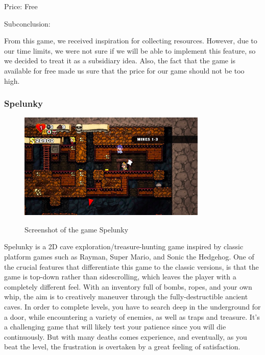 \documentclass[12p]{article}
\begin{document}
Price: Free

Subconclusion:

From this game, we received inspiration for collecting resources. However, due to our time limits, we were not sure if we will be able to implement this feature, so we decided to treat it as a subsidiary idea. Also, the fact that the game is available for free made us sure that the price for our game should not be too high.



\newpage
\subsubsection[Spelunky]{Spelunky \cite{Spelunky}}

\begin{figure}[ht]
 \center
 \includegraphics[width=0.8\textwidth]{StateOfTheArtScreenshots/spelunky}
 \label{sec:StateOfTheArt_Screenshots_Spelunky}
 \caption{Screenshot of the game Spelunky \cite{SpelunkyScreenshot}}
\end{figure}

Spelunky is a 2D cave exploration/treasure-hunting game inspired by classic platform games such as Rayman, Super Mario, and Sonic the Hedgehog. One of the crucial features that differentiate this game to the classic versions, is that the game is top-down rather than sidescrolling, which leaves the player with a completely different feel. With an inventory full of bombs, ropes, and your own whip, the aim is to creatively maneuver through the fully-destructible ancient caves. In order to complete levels, you have to search deep in the underground for a door, while encountering a variety of enemies, as well as traps and treasure. It's a challenging game that will likely test your patience since you will die continuously. But with many deaths comes experience, and eventually, as you beat the level, the frustration is overtaken by a great feeling of satisfaction.
\end{document}
